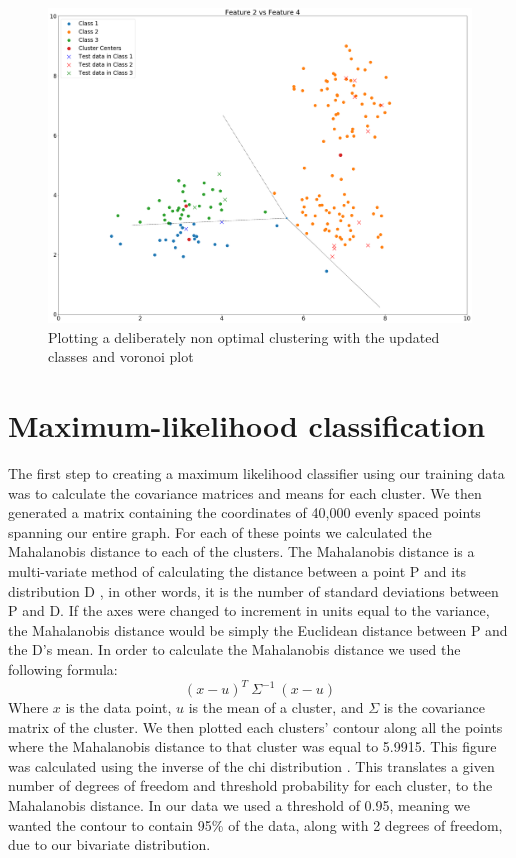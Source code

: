 \documentclass[a4paper]{article}
\begin{document}
\begin{figure}[h!]
\centering
\includegraphics[width=1\columnwidth]{plot3.png}
\caption{Plotting a deliberately non optimal clustering with the updated classes and voronoi plot}
\end{figure}

\section{Maximum-likelihood classification}

The first step to creating a maximum likelihood classifier using our training data was to calculate the covariance matrices and means for each cluster. We then generated a matrix containing the coordinates of 40,000 evenly spaced points spanning our entire graph. For each of these points we calculated the Mahalanobis distance to each of the clusters. The Mahalanobis distance is a multi-variate method of calculating the distance between a point P and its distribution D \cite{mahalwiki}, in other words, it is the number of standard deviations between P and D. If the axes were changed to increment in units equal to the variance, the Mahalanobis distance would be simply the Euclidean distance between P and the D's mean. In order to calculate the Mahalanobis distance we used the following formula:
\begin{equation}
(x - u)^T \ \Sigma ^ {-1} \ (x - u) 
\end{equation}
Where $x$ is the data point, $u$ is the mean of a cluster, and $\Sigma$ is the covariance matrix of the cluster. We then plotted each clusters' contour along all the points where the Mahalanobis distance to that cluster was equal to 5.9915. This figure was calculated using the inverse of the chi distribution \cite{chidist}. This translates a given number of degrees of freedom and threshold probability for each cluster, to the Mahalanobis distance. In our data we used a threshold of 0.95, meaning we wanted the contour to contain 95\% of the data, along with 2 degrees of freedom, due to our bivariate distribution.
\end{document}
